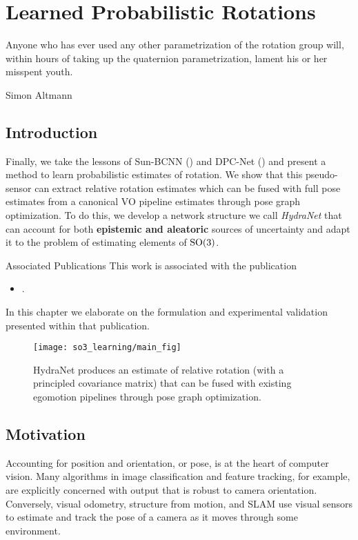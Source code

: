 \chapter{Learned Probabilistic Rotations}
\label{ch:hydranet}
\epigraph{Anyone who has ever used any other parametrization of the rotation group will, within hours of taking up the quaternion parametrization, lament his or her misspent youth.}{Simon Altmann}

\section{Introduction}

Finally, we take the lessons of Sun-BCNN () and DPC-Net () and present a method to learn probabilistic estimates of rotation. We show that this pseudo-sensor can extract relative rotation estimates which can be fused with full pose estimates from a canonical VO pipeline estimates through pose graph optimization. To do this, we develop a network structure we call \textit{HydraNet} that can account for both \textbf{epistemic and aleatoric} sources of uncertainty and adapt it to the problem of estimating elements of $\mathrm{SO}(3)$. 

\begin{remark}{Associated Publications}
This work is associated with the publication
\begin{itemize}
\item {}.
\end{itemize}
In this chapter we elaborate on the formulation and experimental validation presented within that publication.
\end{remark}

\begin{figure}[h!]
	\centering
	\texttt{[image: so3\_learning/main\_fig]}
	\caption{HydraNet produces an estimate of relative rotation (with a principled covariance matrix) that can be fused with existing egomotion pipelines through pose graph optimization.}
	\label{fig:hydranet_fusion_fig}
\end{figure}

\section{Motivation}
Accounting for position and orientation, or pose, is at the heart of computer vision. Many algorithms in image classification and feature tracking, for example, are explicitly concerned with output that is robust to camera orientation. Conversely, visual odometry, structure from motion, and SLAM use visual sensors to estimate and track the pose of a camera as it moves through some environment. 

